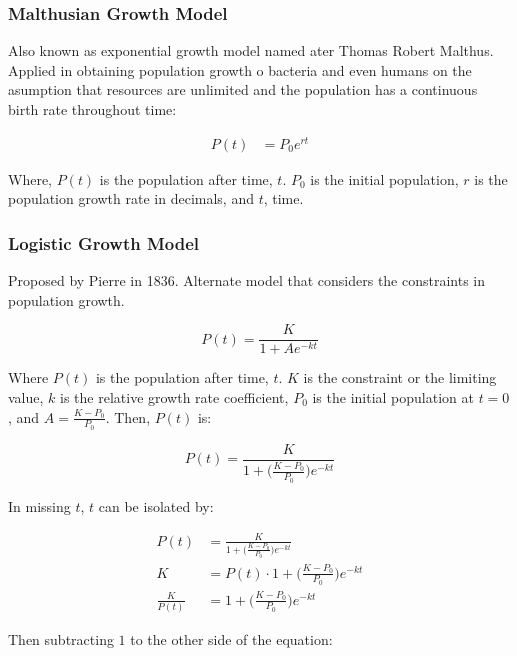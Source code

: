 \documentclass[12pt, UTF8]{article}
\begin{document}
	\subsubsection*{Malthusian Growth Model}
	
	Also known as exponential growth model named ater Thomas Robert Malthus. Applied in obtaining population growth o bacteria and even humans on the asumption that resources are unlimited and the population has a continuous birth rate throughout time:
	
	\begin{align}
		P(t) &= P_{0} e^{rt} 
	\end{align}
	
	Where, $P(t)$ is the population after time, $t$. $P_{0}$ is the initial population, $r$ is the population growth rate in decimals, and $t$, time.
	
	\subsubsection*{Logistic Growth Model}
	
	Proposed by Pierre in 1836. Alternate model that considers the constraints in population growth.
	
	\begin{equation}
		P(t) = \frac{K}{1 + Ae^{-kt}}
	\end{equation}
	
	Where $P(t)$ is the population after time, $t$. $K$ is the constraint or the limiting value, $k$ is the relative growth rate coefficient, $P_{0}$ is the initial population at $t = 0$, and $A = \frac{K - P_{0}}{P_{0}}$. Then, $P(t)$ is:
	
	\begin{equation}
		P(t) = \frac{K}{1 + \big(\frac{K - P_{0}}{P_{0}}\big)e^{-kt}}
	\end{equation}
	
	In missing $t$, $t$ can be isolated by:
	
	\begin{align}
		P(t) &= \frac{K}{1 + \Big(\frac{K - P_{0}}{P_{0}}\Big)e^{-kt}}  \nonumber \\
		K &= P(t) \cdot 1 + \Big(\frac{K - P_{0}}{P_{0}}\Big)e^{-kt}  \nonumber \\
		\frac{K}{P(t)} &= 1 + \Big(\frac{K - P_{0}}{P_{0}}\Big)e^{-kt}  \nonumber 
	\end{align}
	
	Then subtracting $1$ to the other side of the equation:
	
\end{document}
